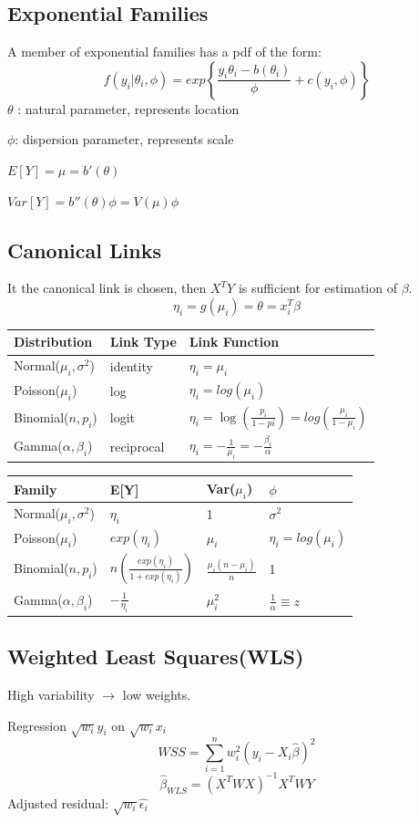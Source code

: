 \documentclass[10pt,landscape, fleqn]{article}
\begin{document}
\begin{multicols}{3}
			\subsection{Exponential Families}
				A member of exponential families has a pdf of the form:
				\[ f(y_i|\theta_i, \phi) = exp\left\{\frac{y_i\theta_i-b(\theta_i)}{\phi} + c(y_i, \phi) \right\} \]
				$\theta$ : natural parameter, represents location \par 
				$\phi$: dispersion parameter, represents scale \par
				$E[Y] = \mu = b'(\theta)$ \par 
				$Var[Y] = b''(\theta)\phi = V(\mu)\phi$
			\subsection{Canonical Links}
				It the canonical link is chosen, then $X^TY$ is sufficient for estimation of $\beta$.
				\[ \eta_i = g(\mu_i) = \theta = x_i^T\beta \]
				\begin{tabular}{ | l | l | l | }
					\hline
					Distribution & Link Type & Link Function\\
					\hline
					Normal($\mu_i, \sigma^2$) & identity & $\eta_i = \mu_i$ \\
					Poisson($\mu_i$) & log & $\eta_i = log(\mu_i)$ \\
					Binomial($n, p_i$) & logit & $\eta_i = \log(\frac{p_i}{1-pi}) = log(\frac{\mu_i}{1-\mu_i})$ \\
					Gamma($\alpha, \beta_i$) & reciprocal & $\eta_i = -\frac{1}{\mu_i} = -\frac{\beta_i}{\alpha} $ \\
					\hline
				\end{tabular}
				 \par 
				\begin{tabular}{ | l | l | l | l | }
					\hline
					Family & E[Y] & Var($\mu_i$) & $\phi$ \\
					\hline
					Normal($\mu_i, \sigma^2$) & $\eta_i$ & 1 & $\sigma^2$ \\
					Poisson($\mu_i$) & $exp(\eta_i)$ & $\mu_i$  &  $\eta_i = log(\mu_i)$ \\
					Binomial($n, p_i$) & $n\left(\frac{exp(\eta_i)}{1+exp(\eta_i)}\right)$ & $\frac{\mu_i(n-\mu_i)}{n}$ & 1 \\
					Gamma($\alpha, \beta_i$) & $-\frac{1}{\eta_i}$ & $\mu_i^2$ & $\frac{1}{\alpha} \equiv z $ \\
					\hline
				\end{tabular}
			\subsection{Weighted Least Squares(WLS)}
				High variability $\rightarrow$ low weights. \par
				Regression $\sqrt{w_i}y_i$ on $\sqrt{w_i}x_i$ 
				\[ WSS = \sum_{i=1}^{n}w_i^2(y_i-X_i\hat{\beta})^2 \]
				\[ \hat{\beta}_{WLS} = (X^TWX)^{-1}X^TWY \]
				Adjusted residual: $\sqrt{w_i}\hat{\epsilon_i}$

\end{multicols}
\end{document}
